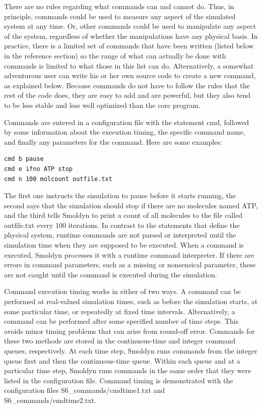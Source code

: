 \documentclass {scrbook}
\begin{document}
There are no rules regarding what commands can and cannot do. Thus, in principle, commands could be used to measure any aspect of the simulated system at any time. Or, other commands could be used to manipulate any aspect of the system, regardless of whether the manipulations have any physical basis. In practice, there is a limited set of commands that have been written (listed below in the reference section) so the range of what can actually be done with commands is limited to what those in this list can do. Alternatively, a somewhat adventurous user can write his or her own source code to create a new command, as explained below. Because commands do not have to follow the rules that the rest of the code does, they are easy to add and are powerful, but they also tend to be less stable and less well optimized than the core program.

Commands are entered in a configuration file with the statement cmd, followed by some information about the execution timing, the specific command name, and finally any parameters for the command. Here are some examples:

\begin{lstlisting}[style=SSAC]
cmd b pause
cmd e ifno ATP stop
cmd n 100 molcount outfile.txt
\end{lstlisting}

The first one instructs the simulation to pause before it starts running, the second says that the simulation should stop if there are no molecules named ATP, and the third tells Smoldyn to print a count of all molecules to the file called outfile.txt every 100 iterations. In contrast to the statements that define the physical system, runtime commands are not parsed or interpreted until the simulation time when they are supposed to be executed. When a command is executed, Smoldyn processes it with a runtime command interpreter. If there are errors in command parameters, such as a missing or nonsensical parameter, these are not caught until the command is executed during the simulation.

Command execution timing works in either of two ways. A command can be performed at real-valued simulation times, such as before the simulation starts, at some particular time, or repeatedly at fixed time intervals. Alternatively, a command can be performed after some specified number of time steps. This avoids minor timing problems that can arise from round-off error. Commands for these two methods are stored in the continuous-time and integer command queues, respectively. At each time step, Smoldyn runs commands from the integer queue first and then the continuous-time queue. Within each queue and at a particular time step, Smoldyn runs commands in the same order that they were listed in the configuration file. Command timing is demonstrated with the configuration files S6\_commands/cmdtime1.txt and S6\_commands/cmdtime2.txt.
\end{document}
